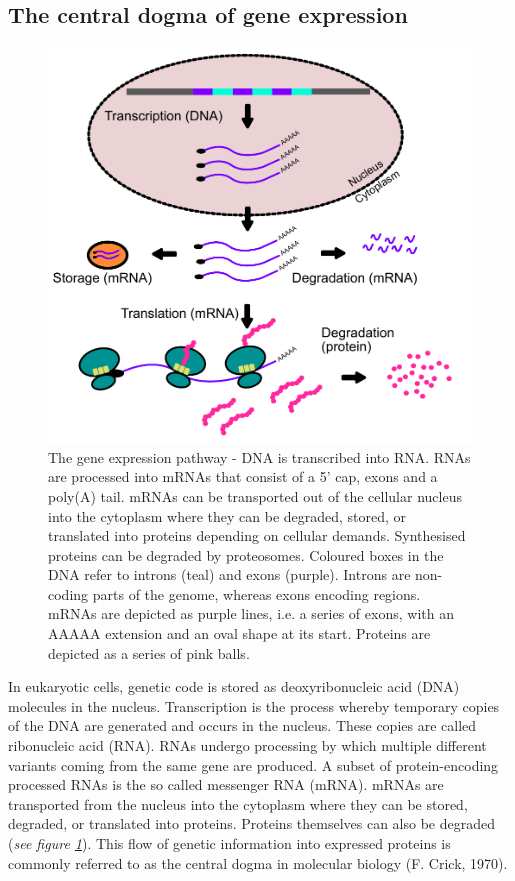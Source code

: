 \documentclass[
  12pt,
  openany]{book}
\begin{document}
\subsection{The central dogma of gene expression}
  \begin{figure}
  \includegraphics{./figures/geneExprPath_2.pdf}
  \caption{The gene expression pathway - DNA is transcribed into RNA. RNAs are processed into mRNAs that consist of a 5' cap, exons and a poly(A) tail. mRNAs can be transported out of the cellular nucleus into the cytoplasm where they can be degraded, stored, or translated into proteins depending on cellular demands. Synthesised proteins can be degraded by proteosomes. Coloured boxes in the DNA refer to introns (teal) and exons (purple). Introns are non-coding parts of the genome, whereas exons encoding regions. mRNAs are depicted as purple lines, i.e. a series of exons, with an AAAAA extension and an oval shape at its start. Proteins are depicted as a series of pink balls.  \label{fig:geneExprPath}}
\end{figure}

In eukaryotic cells, genetic code is stored as deoxyribonucleic acid (DNA) molecules in the nucleus. Transcription is the process whereby temporary copies of the DNA are generated and occurs in the nucleus. These copies are called ribonucleic acid (RNA). RNAs undergo processing by which multiple different variants coming from the same gene are produced. A subset of protein-encoding processed RNAs is the so called messenger RNA (mRNA). mRNAs are transported from the nucleus into the cytoplasm where they can be stored, degraded, or translated into proteins. Proteins themselves can also be degraded (\emph{see figure \ref{fig:geneExprPath}}). This flow of genetic information into expressed proteins is commonly referred to as the central dogma in molecular biology (F. Crick, 1970).
\clearpage
\end{document}
